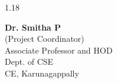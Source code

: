 \begin{spacing}{1.18}
\vspace*{1.0cm}

\begin{center}
\begin{minipage}[t]{0.6\textwidth}
	\centering
	\textbf{Dr. Smitha P} \\
	(Project Coordinator) \\
	Associate Professor and HOD \\
	Dept. of CSE \\
	CE, Karunagappally
\end{minipage}
\end{center}

\end{spacing}

\thispagestyle{empty}
